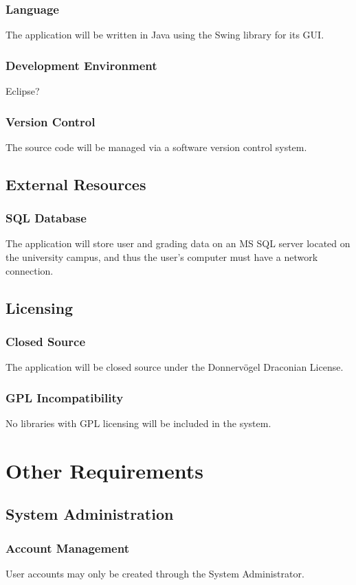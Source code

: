 \documentclass{article}
\begin{document}
\subsubsection{Language}
The application will be written in Java using the Swing library for its GUI.
\subsubsection{Development Environment}
Eclipse?
\subsubsection{Version Control}
The source code will be managed via a software version control system.
\subsection{External Resources}
\subsubsection{SQL Database}
The application will store user and grading data on an MS SQL server located on
the university campus, and thus the user's computer must have a network connection.
\subsection{Licensing}
\subsubsection{Closed Source}
The application will be closed source under the Donnervögel Draconian License.
\subsubsection{GPL Incompatibility}
No libraries with GPL licensing will be included in the system.

\section{Other Requirements}
\subsection{System Administration}
\subsubsection{Account Management}
User accounts may only be created through the System Administrator.
\end{document}
